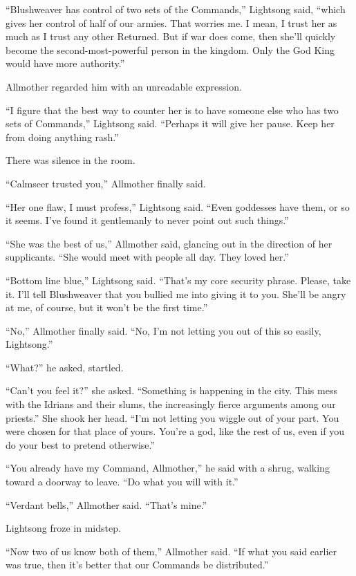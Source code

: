“Blushweaver has control of two sets of the Commands,” Lightsong said, “which gives her control of half of our armies. That worries me. I mean, I trust her as much as I trust any other Returned. But if war does come, then she’ll quickly become the second-most-powerful person in the kingdom. Only the God King would have more authority.”

Allmother regarded him with an unreadable expression.

“I figure that the best way to counter her is to have someone else who has two sets of Commands,” Lightsong said. “Perhaps it will give her pause. Keep her from doing anything rash.”

There was silence in the room.

“Calmseer trusted you,” Allmother finally said.

“Her one flaw, I must profess,” Lightsong said. “Even goddesses have them, or so it seems. I’ve found it gentlemanly to never point out such things.”

“She was the best of us,” Allmother said, glancing out in the direction of her supplicants. “She would meet with people all day. They loved her.”

“Bottom line blue,” Lightsong said. “That’s my core security phrase. Please, take it. I’ll tell Blushweaver that you bullied me into giving it to you. She’ll be angry at me, of course, but it won’t be the first time.”

“No,” Allmother finally said. “No, I’m not letting you out of this so easily, Lightsong.”

“What?” he asked, startled.

“Can’t you feel it?” she asked. “Something is happening in the city. This mess with the Idrians and their slums, the increasingly fierce arguments among our priests.” She shook her head. “I’m not letting you wiggle out of your part. You were chosen for that place of yours. You’re a god, like the rest of us, even if you do your best to pretend otherwise.”

“You already have my Command, Allmother,” he said with a shrug, walking toward a doorway to leave. “Do what you will with it.”

“Verdant bells,” Allmother said. “That’s mine.”

Lightsong froze in midstep.

“Now two of us know both of them,” Allmother said. “If what you said earlier was true, then it’s better that our Commands be distributed.”

